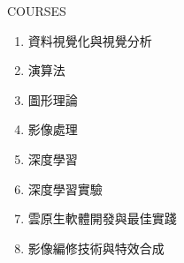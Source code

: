 \documentclass{resume}
\begin{document}
\begin{rSection}{COURSES}
\noindent
\begin{enumerate}
    \item 資料視覺化與視覺分析
    \item 演算法
    \item 圖形理論
    \item 影像處理
    \item 深度學習
    \item 深度學習實驗
    \item 雲原生軟體開發與最佳實踐
    \item 影像編修技術與特效合成
\end{enumerate}

\end{rSection} 
\end{document}
